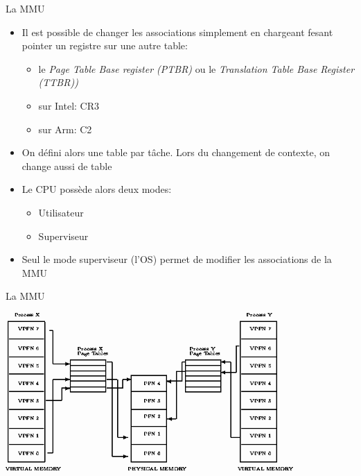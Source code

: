 \begin{frame}{La MMU}
  \begin{itemize}
  \item  Il est  possible de  changer les  associations  simplement en
    chargeant fesant pointer un registre sur une autre table:
    \begin{itemize}
    \item   le  \emph{Page   Table   Base  register   (PTBR)}  ou   le
      \emph{Translation Table Base Register (TTBR))}
    \item sur Intel: CR3
    \item  sur Arm: C2
    \end{itemize}
  \item On  défini alors une table  par tâche.  Lors  du changement de
    contexte, on change aussi de table
  \item Le CPU possède alors deux modes:
    \begin{itemize}
    \item  Utilisateur
    \item  Superviseur
    \end{itemize}
  \item  Seul  le  mode  superviseur  (l'OS) permet  de  modifier  les
    associations de la MMU
  \end{itemize}
\end{frame}

\begin{frame}{La MMU}
  \begin{center}
    \includegraphics[height=6cm]{pics/img9}
  \end{center}
\end{frame}

